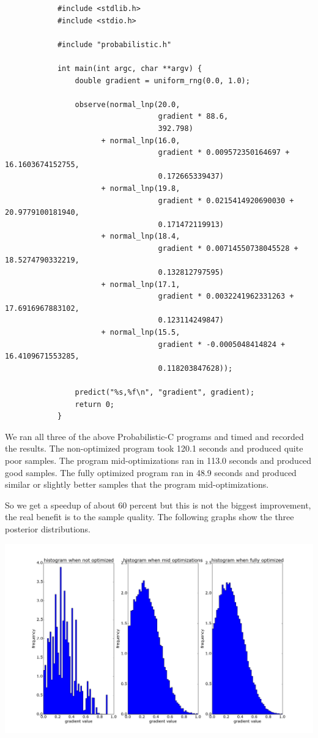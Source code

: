 \documentclass[a4paper]{article}
\begin{document}
\begin{center}
	\begin{varwidth}{\linewidth}
		\small
		\begin{verbatim}
			#include <stdlib.h>
			#include <stdio.h>

			#include "probabilistic.h"

			int main(int argc, char **argv) {
			    double gradient = uniform_rng(0.0, 1.0);

			    observe(normal_lnp(20.0,
			                       gradient * 88.6,
			                       392.798)
			          + normal_lnp(16.0,
			                       gradient * 0.009572350164697 + 16.1603674152755,
			                       0.172665339437)
			          + normal_lnp(19.8,
			                       gradient * 0.0215414920690030 + 20.9779100181940,
			                       0.171472119913)
			          + normal_lnp(18.4,
			                       gradient * 0.00714550738045528 + 18.5274790332219,
			                       0.132812797595)
			          + normal_lnp(17.1,
			                       gradient * 0.0032241962331263 + 17.6916967883102,
			                       0.123114249847)
			          + normal_lnp(15.5,
			                       gradient * -0.0005048414824 + 16.4109671553285,
			                       0.118203847628));
			    
			    predict("%s,%f\n", "gradient", gradient);
			    return 0;
			}
		\end{verbatim}
	\end{varwidth}
\end{center}

We ran all three of the above Probabilistic-C programs and timed and recorded the results. The non-optimized program took 120.1 seconds and produced quite poor samples. The program mid-optimizations ran in 113.0 seconds and produced good samples. The fully optimized program ran in 48.9 seconds and produced similar or slightly better samples that the program mid-optimizations.

So we get a speedup of about 60 percent but this is not the biggest improvement, the real benefit is to the sample quality. The following graphs show the three posterior distributions.

\centerline{\includegraphics[width=16cm]{images/crickets.png}}
\end{document}
